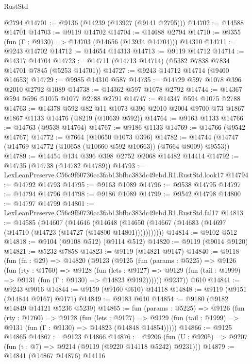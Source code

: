 \begin{lexlean}{RustStd}
\begin{coremodule}
    @2794
@14701 := @9136 (@14239 (@13927 (@9141 @2795)))
@14702 := @14588 @14701
@14703 := @9119 @14702
@14704 := @14688 @2794
@14710 := @9355 (fun (Γ : @9130) => @14703 (@14656 (@13934 @14704))) @14310
@14711 := @9243 @14702
@14712 := @14654 @14313
@14713 := @9119 @14712
@14714 := @14317 @14704
@14723 := @14711 (@14713 @14714) (@5382 @7838 @7834 @14701 @7845 (@5253 @14701))
@14727 := @9243 @14712 @14714 (@9400 @14653)
@14729 := @9985 @14310 @587
@14735 := @14729 @597 @1078 @396 @2010 @2792 @1089
@14738 := @14362 @597 @1078 @2792
@14744 := @14367 @594 @596 @1075 @1077 @2788 @2791
@14747 := @14347 @594 @1075 @2788
@14763 := @14378
    @592
    @82
    @11
    @1073
    @396
    @2010
    @2004
    @9700
    @73
    @1867
    @1867
    @1133
    @14476
    (@8219 (@10639 @592))
@14764 := @9163 @1133
@14766 := @14763 (@9538 @14764)
@14767 := @9186 @1133
@14769 := @14766 (@9542 @14767)
@14772 := @7664 (@10650 @1073 @396)
@14782 := @14744 (@14747 (@14769 @14772 (@10658 (@10660 @592 @10663)) (@7664 @8009) @9553))
@14789 := @14454 @134 @396 @398 @2752 @2068 @14482 @14414
@14792 := @14735 (@14738 (@14782 @14789))
@14793 := LexLeanPreserve.C56c9f60736cc3fab13bfbc383dc49ebd.R1.RustStd.look17
@14794 := @14792 @14793
@14795 := @9163 @1089
@14796 := @9538 @14795
@14797 := @14794 @14796
@14798 := @9186 @1089
@14799 := @9542 @14798
@14800 := @14797 @14799
@14801 := LexLeanPreserve.C56c9f60736cc3fab13bfbc383dc49ebd.R1.RustStd.fal17
@14813 := @14585
    (@14607
      (@14646
        (@14648 (@14650 (@14667 (@14683 (@14697 (@14710 (@14723 (@14727 (@14800 @14801)))))))))))
@14814 := @9102 @512
@14818 := @9104 (@9108 @512) (@9114 @512)
@14820 := @9119 (@9014 @9120)
@14821 := @5232 @7858
@14823 := @9119 (@14821 @9147)
@14840 := @9118
    (fun (fn : @29) =>
    @14820
      (@9123
        (@9125
          (fun (params : @5225) =>
          @9126
            (fun (rty : @1760) =>
            @9128
              (fun (lets : @9127) =>
              @9129 (fun (tail : @1999) => @9131 (fun (Γ : @9130) => @14823 @9192))))))
        @9237))
    @610
@14841 := @9243 @9016
@14844 := @9159 (@9160 @610) @14118
@14848 := @9119 (@9151 (@14844 @9167) @9171)
@14849 := @9183 @610
@14854 := @9180 (@9182 @14849 @14121 @5236 @5239)
@14865 := fun (params : @5225) =>
  @9126
    (fun (rty : @1760) =>
    @9128
      (fun (lets : @9127) =>
      @9129 (fun (tail : @1999) => @9131 (fun (Γ : @9130) => @14823 (@14848 @14854)))))
@14866 := @9125 @14865
@14867 := @9123 @14866
@14876 := @9206
    (fun (U : @9205) => @9207 (fun (t : @7) => @9214 (@9119 (@9220 @14118 @5242) @9231)))
@14879 := @14841 (@14867 @14876) @14116

\end{coremodule}
\end{lexlean}
